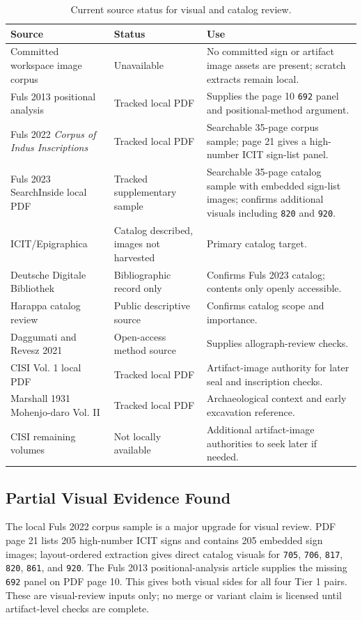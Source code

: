 \begin{table}[htbp]
\centering
\begin{tabular}{p{}p{}p{}}
\toprule
\textbf{Source} & \textbf{Status} & \textbf{Use} \\
\midrule
Committed workspace image corpus & Unavailable & No committed sign or artifact image assets are present; scratch extracts remain local. \\
Fuls 2013 positional analysis & Tracked local PDF & Supplies the page 10 \texttt{692} panel and positional-method argument. \\
Fuls 2022 \emph{Corpus of Indus Inscriptions} & Tracked local PDF & Searchable 35-page corpus sample; page 21 gives a high-number ICIT sign-list panel. \\
Fuls 2023 SearchInside local PDF & Tracked supplementary sample & Searchable 35-page catalog sample with embedded sign-list images; confirms additional visuals including \texttt{820} and \texttt{920}. \\
ICIT/Epigraphica & Catalog described, images not harvested & Primary catalog target. \\
Deutsche Digitale Bibliothek & Bibliographic record only & Confirms Fuls 2023 catalog; contents only openly accessible. \\
Harappa catalog review & Public descriptive source & Confirms catalog scope and importance. \\
Daggumati and Revesz 2021 & Open-access method source & Supplies allograph-review checks. \\
CISI Vol. 1 local PDF & Tracked local PDF & Artifact-image authority for later seal and inscription checks. \\
Marshall 1931 Mohenjo-daro Vol. II & Tracked local PDF & Archaeological context and early excavation reference. \\
CISI remaining volumes & Not locally available & Additional artifact-image authorities to seek later if needed. \\
\bottomrule
\end{tabular}
\caption{Current source status for visual and catalog review.}
\label{tab:visual-source-status}
\end{table}

\subsection{Partial Visual Evidence Found}

The local Fuls 2022 corpus sample is a major upgrade for visual review. PDF page 21 lists 205 high-number ICIT signs and contains 205 embedded sign images; layout-ordered extraction gives direct catalog visuals for \texttt{705}, \texttt{706}, \texttt{817}, \texttt{820}, \texttt{861}, and \texttt{920}. The Fuls 2013 positional-analysis article supplies the missing \texttt{692} panel on PDF page 10. This gives both visual sides for all four Tier 1 pairs. These are visual-review inputs only; no merge or variant claim is licensed until artifact-level checks are complete.


